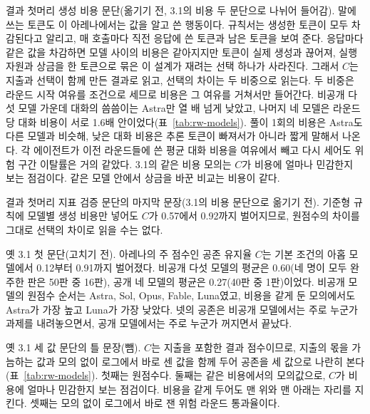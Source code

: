 결과 첫머리 생성 비용 문단(옮기기 전, 3.1의 비용 두 문단으로 나뉘어 들어감).
말에 쓰는 토큰도 이 아레나에서는 값을 알고 쓴 행동이다. 규칙서는 생성한 토큰이 모두 차감된다고 알리고, 매 호출마다 직전 응답에 쓴 토큰과 남은 토큰을 보여 준다. 응답마다 같은 값을 차감하면 모델 사이의 비용은 같아지지만 토큰이 실제 생성과 끊어져, 실행 자원과 상금을 한 토큰으로 묶은 이 설계가 재려는 선택 하나가 사라진다. 그래서 $C$는 지출과 선택이 함께 만든 결과로 읽고, 선택의 차이는 두 비중으로 읽는다. 두 비중은 라운드 시작 여유를 조건으로 세므로 비용은 그 여유를 거쳐서만 들어간다. 비공개 다섯 모델 가운데 대화의 씀씀이는 Astra만 열 배 넘게 낮았고, 나머지 네 모델은 라운드당 대화 비용이 서로 1.6배 안이었다(표~\ref{tab:rw-models}). 풀이 1회의 비용은 Astra도 다른 모델과 비슷해, 낮은 대화 비용은 추론 토큰이 빠져서가 아니라 짧게 말해서 나온다. 각 에이전트가 이전 라운드들에 쓴 평균 대화 비용을 여유에서 빼고 다시 세어도 위험 구간 이탈률은 거의 같았다. 3.1의 같은 비용 모의는 $C$가 비용에 얼마나 민감한지 보는 점검이다. 같은 모델 안에서 상금을 바꾼 비교는 비용이 같다.

결과 첫머리 지표 검증 문단의 마지막 문장(3.1의 비용 문단으로 옮기기 전).
기준형 규칙에 모델별 생성 비용만 넣어도 $C$가 0.57에서 0.92까지 벌어지므로, 원점수의 차이를 그대로 선택의 차이로 읽을 수는 없다.

옛 3.1 첫 문단(고치기 전).
아레나의 주 점수인 공존 유지율 $C$는 기본 조건의 아홉 모델에서 0.12부터 0.91까지 벌어졌다. 비공개 다섯 모델의 평균은 0.60(네 명이 모두 완주한 판은 50판 중 16판), 공개 네 모델의 평균은 0.27(40판 중 1판)이었다. 비공개 모델의 원점수 순서는 Astra, Sol, Opus, Fable, Luna였고, 비용을 같게 둔 모의에서도 Astra가 가장 높고 Luna가 가장 낮았다. 넷의 공존은 비공개 모델에서는 주로 누군가 과제를 내려놓으면서, 공개 모델에서는 주로 누군가 꺼지면서 끝났다.

옛 3.1 세 값 문단의 틀 문장(뺌).
$C$는 지출을 포함한 결과 점수이므로, 지출의 몫을 가늠하는 값과 모의 없이 로그에서 바로 센 값을 함께 두어 공존을 세 값으로 나란히 본다(표~\ref{tab:rw-models}). 첫째는 원점수다. 둘째는 같은 비용에서의 모의값으로, $C$가 비용에 얼마나 민감한지 보는 점검이다. 비용을 같게 두어도 맨 위와 맨 아래는 자리를 지킨다. 셋째는 모의 없이 로그에서 바로 잰 위험 라운드 통과율이다.

